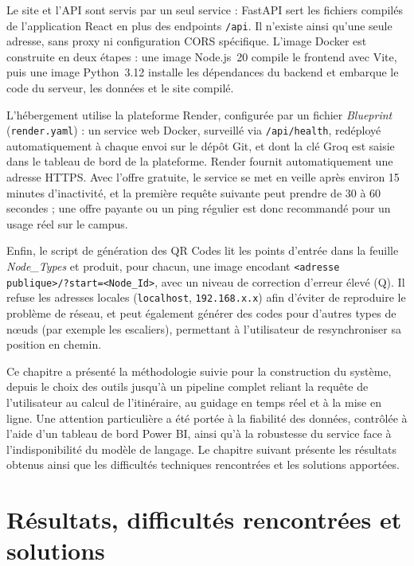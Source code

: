 \documentclass[12pt,a4paper]{report}
\begin{document}
Le site et l'API sont servis par un seul service : FastAPI sert les fichiers compilés de
l'application React en plus des endpoints \texttt{/api}. Il n'existe ainsi qu'une seule adresse,
sans proxy ni configuration CORS spécifique. L'image Docker est construite en deux étapes : une
image Node.js~20 compile le frontend avec Vite, puis une image Python~3.12 installe les dépendances
du backend et embarque le code du serveur, les données et le site compilé.

L'hébergement utilise la plateforme Render, configurée par un fichier \emph{Blueprint}
(\texttt{render.yaml}) : un service web Docker, surveillé via \texttt{/api/health}, redéployé
automatiquement à chaque envoi sur le dépôt Git, et dont la clé Groq est saisie dans le tableau de
bord de la plateforme. Render fournit automatiquement une adresse HTTPS. Avec l'offre gratuite, le
service se met en veille après environ 15 minutes d'inactivité, et la première requête suivante
peut prendre de 30 à 60 secondes ; une offre payante ou un ping régulier est donc recommandé pour
un usage réel sur le campus.

Enfin, le script de génération des QR Codes lit les points d'entrée dans la feuille
\emph{Node\_Types} et produit, pour chacun, une image encodant \texttt{<adresse
publique>/?start=<Node\_Id>}, avec un niveau de correction d'erreur élevé (Q). Il refuse les
adresses locales (\texttt{localhost}, \texttt{192.168.x.x}) afin d'éviter de reproduire le
problème de réseau, et peut également générer des codes pour d'autres types de nœuds (par exemple
les escaliers), permettant à l'utilisateur de resynchroniser sa position en chemin.

\medskip
Ce chapitre a présenté la méthodologie suivie pour la construction du système, depuis le choix des
outils jusqu'à un pipeline complet reliant la requête de l'utilisateur au calcul de l'itinéraire,
au guidage en temps réel et à la mise en ligne. Une attention particulière a été portée à la
fiabilité des données, contrôlée à l'aide d'un tableau de bord Power BI, ainsi qu'à la robustesse
du service face à l'indisponibilité du modèle de langage. Le chapitre suivant présente les
résultats obtenus ainsi que les difficultés techniques rencontrées et les solutions apportées.

\chapter{Résultats, difficultés rencontrées et solutions}
\end{document}
